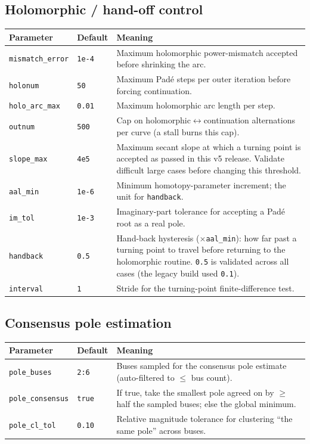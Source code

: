 \documentclass[11pt,a4paper]{article}
\newcommand{\code}[1]{\texttt{#1}}
\begin{document}
\subsection{Holomorphic / hand-off control}
\begin{center}\small
\begin{longtable}{@{}p{}p{}p{}@{}}
\toprule
\textbf{Parameter} & \textbf{Default} & \textbf{Meaning}\\
\midrule\endhead
\code{mismatch_error}& \code{1e-4} & Maximum holomorphic power-mismatch accepted before shrinking the arc.\\
\code{holonum}      & \code{50}   & Maximum Pad\'e steps per outer iteration before forcing continuation.\\
\code{holo_arc_max} & \code{0.01} & Maximum holomorphic arc length per step.\\
\code{outnum}       & \code{500}  & Cap on holomorphic$\leftrightarrow$continuation alternations per curve (a stall burns this cap).\\
\code{slope_max}    & \code{4e5}  & Maximum secant slope at which a turning point is accepted as passed in this v5 release. Validate difficult large cases before changing this threshold.\\
\code{aal_min}      & \code{1e-6} & Minimum homotopy-parameter increment; the unit for \code{handback}.\\
\code{im_tol}       & \code{1e-3} & Imaginary-part tolerance for accepting a Pad\'e root as a real pole.\\
\code{handback}     & \code{0.5}  & Hand-back hysteresis ($\times$\code{aal_min}): how far past a turning point to travel before returning to the holomorphic routine. \code{0.5} is validated across all cases (the legacy build used \code{0.1}).\\
\code{interval}     & \code{1}    & Stride for the turning-point finite-difference test.\\
\bottomrule
\end{longtable}
\end{center}

\subsection{Consensus pole estimation}
\begin{center}\small
\begin{longtable}{@{}p{}p{}p{}@{}}
\toprule
\textbf{Parameter} & \textbf{Default} & \textbf{Meaning}\\
\midrule\endhead
\code{pole_buses}     & \code{2:6}      & Buses sampled for the consensus pole estimate (auto-filtered to $\le$ bus count).\\
\code{pole_consensus}  & \code{true}     & If true, take the smallest pole agreed on by $\ge$ half the sampled buses; else the global minimum.\\
\code{pole_cl_tol}     & \code{0.10}     & Relative magnitude tolerance for clustering ``the same pole'' across buses.\\
\bottomrule
\end{longtable}
\end{center}
\end{document}
